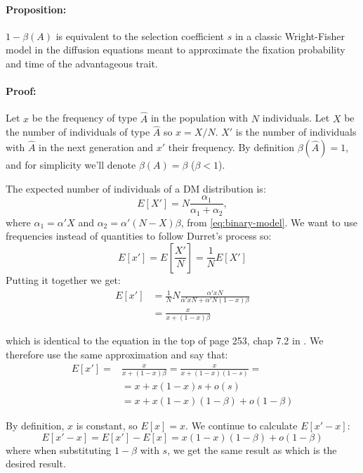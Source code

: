 \documentclass[11pt]{article}
\begin{document}
\paragraph{Proposition:} $1-\beta(A)$ is equivalent to the selection coefficient $s$ in a classic Wright-Fisher model in the diffusion equations meant to approximate the fixation probability and time of the advantageous trait.

\paragraph{Proof:} Let $x$ be the frequency of type $\hat{A}$ in the population with $N$ individuals. Let $X$ be the number of individuals of type $\hat{A}$ so $x=X/N$. $X'$ is the number of individuals with $\hat{A}$ in the next generation and $x'$ their frequency.
By definition $\beta(\hat{A})=1$, and for simplicity we'll denote $\beta(A)=\beta$ ($\beta<1$).

The expected number of individuals of a DM distribution is:
\begin{equation}
E[X'] = N  \frac{\alpha_1}{\alpha_1+\alpha_2},
\end{equation}
where $\alpha_1 = \alpha' X$ and $\alpha_2 = \alpha'(N-X)\beta$, from  \cref{eq:binary-model}.
We want to use frequencies instead of quantities to follow Durret's process so:
\begin{equation}
E[x'] = E[\frac{X'}{N}] = \frac{1}{N}E[X']
\end{equation}
Putting it together we get:
\begin{equation}
\begin{split}
E[x'] &= \frac{1}{N}N\frac{\alpha' xN}{\alpha' xN + \alpha' N (1-x)\beta}\\
	 &= \frac{x}{x + (1-x)\beta}
\end{split}
\end{equation}

which is identical to the equation in the top of page 253, chap 7.2 in \citet{durret}. We therefore use the same approximation and say that:
\begin{equation}
\begin{split}
E[x'] =& \frac{x}{x + (1-x)\beta} = \frac{x}{x + (1-x)(1-s)} =\\
 &= x + x(1-x)s + o(s)\\
  &= x + x(1-x)(1-\beta) + o(1-\beta)
\end{split}
\end{equation}

By definition, $x$ is constant, so $E[x] = x$. We continue to calculate $E[x'-x]$:
\begin{equation}\label{eq:expec_freq}
E[x'-x] = E[x'] - E[x] = x(1-x)(1-\beta) + o(1-\beta)
\end{equation}
where when substituting $1-\beta$ with $s$, we get the same result as \citet{durret} which is the desired result.
\end{document}
